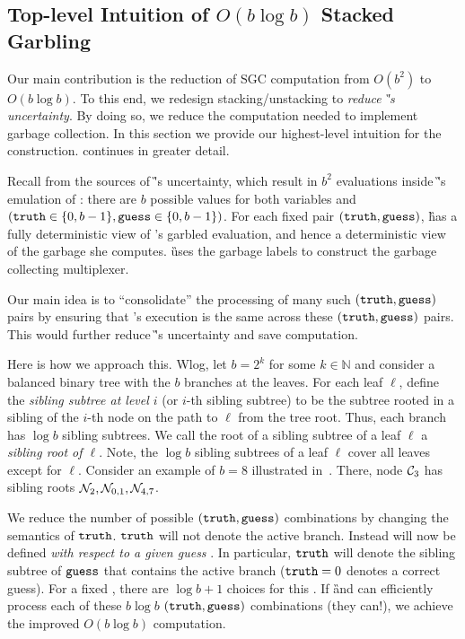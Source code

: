 
\subsection{Top-level Intuition of $O(b \log b)$ Stacked Garbling}
\label{sec:intuition}

Our main contribution is the reduction of SGC computation from
$O(b^2)$ to $O(b \log b)$.  To this end, we redesign
stacking/unstacking to \emph{reduce \G's
uncertainty}.
%
By doing so, we reduce the computation needed to implement garbage
collection.
%
In this section we provide our highest-level intuition for the
construction.  continues in greater detail.

Recall from  the  sources of \G's
uncertainty, which result in $b^2$ evaluations inside \G's emulation
of \E: there are $b$ possible values for both variables \truth and \guess
$(\mathtt{truth} \in\{0,b-1\}, \mathtt{guess}\in\{0,b-1\})$.
%
For each fixed pair  $(\mathtt{truth},\mathtt{guess})$, \G has a fully
deterministic view of \E's garbled evaluation, and hence a deterministic view of
the garbage she computes.
\G uses the garbage labels to construct the garbage collecting multiplexer.

Our main idea is to ``consolidate'' the processing of many
such $(\mathtt{truth},\mathtt{guess})$ pairs by ensuring that \E's execution is the
same across these $(\mathtt{truth},\mathtt{guess})$ pairs.  This would further reduce \G's
uncertainty and save computation.

Here is how we approach this.
Wlog, let $b = 2^k$ for some $k \in \mathbb{N}$ and consider a balanced
binary tree with the $b$ branches at the leaves.
For each leaf $\ell$, define the {\em sibling subtree at level $i$} (or
$i$-th  sibling subtree) to be the subtree rooted in a sibling of the
$i$-th node on the path to $\ell$ from the tree root.  Thus, each branch
has $\log b$ sibling subtrees.
We call the root of a
sibling subtree of a leaf $\ell$ a {\em sibling root of $\ell$}.
Note, the $\log b$ sibling subtrees of a leaf $\ell$ 
cover all leaves except for $\ell$.
Consider an example of $b=8$ illustrated in~.
There, node $\mathcal C_3$ has sibling roots $\mathtt{\cal N}_2, \mathtt{\cal N}_{0,1},
\mathtt{\cal N}_{4,7}$.

We reduce the number of possible $(\mathtt{truth}, \mathtt{guess})$ combinations by
changing the semantics of $\mathtt{truth}$.
$\mathtt{truth}$ will not denote the active branch. Instead \truth will
now be defined \emph{with respect to a given guess} \guess.
In particular, $\mathtt{truth}$ will denote the sibling subtree of $\mathtt{guess}$
that contains the active branch ($\mathtt{truth} = 0$ denotes a correct
guess).
For a fixed \guess, there are $\log b + 1$
choices for this \truth.  If \G and \E can efficiently process each
of these $b\log b$  $(\mathtt{truth},\mathtt{guess})$ combinations  (they
can!), we achieve the improved $O(b\log b)$ computation.
